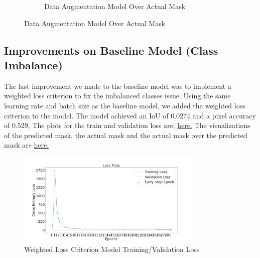 \documentclass{article}
\begin{document}
\begin{figure}[h!]
\begin{subfigure}[b]{0.45\textwidth}
      \caption{Data Augmentation Model Over Actual Mask}
      \label{fig:data_augmentation_over_actual}
  \end{subfigure}
  \label{fig:data_augmentation_masks_visualization}
\end{figure}

\subsection{Improvements on Baseline Model (Class Imbalance)}
The last improvement we made to the baseline model was to implement a weighted loss criterion to fix the imbalanced classes issue. Using the same learning rate and batch size as the baseline model, we added the weighted loss criterion to the model. The model achieved an IoU of $0.0274$ and a pixel accuracy of $0.529$, The plots for the train and validation loss are, \hyperref[fig:weight_imbalanced_train_loss]{here.} The visualizations of the predicted mask, the actual mask and the actual mask over the predicted mask are \hyperref[fig:weight_imbalanced_masks_visualization]{here.}

\begin{figure}[h!]
  \centering
  \includegraphics[width=0.8\textwidth]{include/plots/train_4_c_loss.png}
  \caption{Weighted Loss Criterion Model Training/Validation Loss}
  \label{fig:weight_imbalanced_train_loss}
\end{figure}
\end{document}
